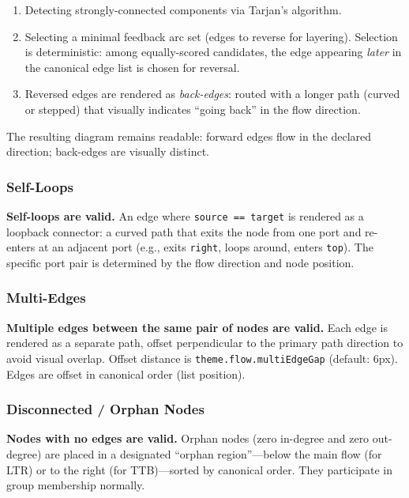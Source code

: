 \begin{enumerate}
  \item Detecting strongly-connected components via Tarjan's algorithm.
  \item Selecting a minimal feedback arc set (edges to reverse for layering). Selection is deterministic: among equally-scored candidates, the edge appearing \emph{later} in the canonical edge list is chosen for reversal.
  \item Reversed edges are rendered as \emph{back-edges}: routed with a longer path (curved or stepped) that visually indicates ``going back'' in the flow direction.
\end{enumerate}

The resulting diagram remains readable: forward edges flow in the declared direction; back-edges are visually distinct.

\subsubsection{Self-Loops}

\textbf{Self-loops are valid.} An edge where \texttt{source == target} is rendered as a loopback connector: a curved path that exits the node from one port and re-enters at an adjacent port (e.g., exits \texttt{right}, loops around, enters \texttt{top}). The specific port pair is determined by the flow direction and node position.

\subsubsection{Multi-Edges}

\textbf{Multiple edges between the same pair of nodes are valid.} Each edge is rendered as a separate path, offset perpendicular to the primary path direction to avoid visual overlap. Offset distance is \texttt{theme.flow.multiEdgeGap} (default: 6px). Edges are offset in canonical order (list position).

\subsubsection{Disconnected / Orphan Nodes}

\textbf{Nodes with no edges are valid.} Orphan nodes (zero in-degree and zero out-degree) are placed in a designated ``orphan region''---below the main flow (for LTR) or to the right (for TTB)---sorted by canonical order. They participate in group membership normally.

